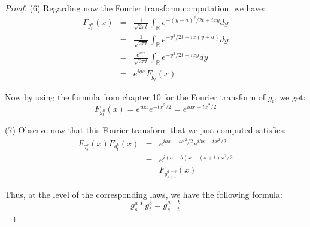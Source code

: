 \documentclass[12pt]{amsbook}
\begin{document}
\begin{proof}
(6) Regarding now the Fourier transform computation, we have:
\begin{eqnarray*}
F_{g_t^a}(x)
&=&\frac{1}{\sqrt{2\pi t}}\int_\mathbb Re^{-(y-a)^2/2t+ixy}dy\\
&=&\frac{1}{\sqrt{2\pi t}}\int_\mathbb Re^{-y^2/2t+ix(y+a)}dy\\
&=&\frac{e^{iax}}{\sqrt{2\pi t}}\int_\mathbb Re^{-y^2/2t+ixy}dy\\
&=&e^{iax}F_{g_t}(x)
\end{eqnarray*}

Now by using the formula from chapter 10 for the Fourier transform of $g_t$, we get:
$$F_{g_t^a}(x)=e^{iax}e^{-tx^2/2}=e^{iax-tx^2/2}$$
 
(7) Observe now that this Fourier transform that we just computed satisfies:
\begin{eqnarray*}
F_{g_s^a}(x)F_{g_t^b}(x)
&=&e^{iax-sx^2/2}e^{ibx-tx^2/2}\\
&=&e^{i(a+b)x-(s+t)x^2/2}\\
&=&F_{g_{s+t}^{a+b}}(x)
\end{eqnarray*}

Thus, at the level of the corresponding laws, we have the following formula:
$$g_s^a*g_t^b=g_{s+t}^{a+b}$$


\end{proof}
\end{document}
